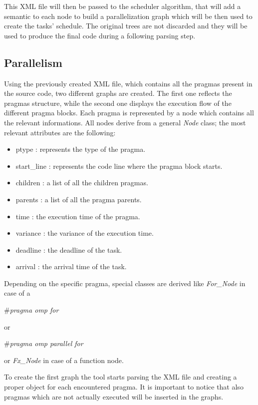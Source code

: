 \documentclass[a4paper,12pt,oneside]{book}
\begin{document}
This XML file will then be passed to the scheduler algorithm, that will add a semantic to each node to build a parallelization graph  which will be then used to create the tasks’ schedule. The original trees are not discarded and they will be used to produce the final code during a following parsing step.

\subsection{Parallelism}
\label{paralelism}

Using the previously created XML file, which contains all the pragmas present in the source code, two different graphs are created. The first one reflects the pragmas structure, while the second one displays the execution flow of the different pragma blocks. Each pragma is represented by a node which contains all the relevant informations. All nodes derive from a general \emph{Node} class; the most relevant attributes are the following:
\begin{itemize}
\item{ptype : represents the type of the pragma.}
\item{start\_line : represents the code line where the pragma block starts.}
\item{children : a list of all the children pragmas.}
\item{parents : a list of all the pragma parents.}
\item{time : the execution time of the pragma.}
\item{variance : the variance of the execution time.}
\item{deadline : the deadline of the task.}
\item{arrival : the arrival time of the task.}
\end{itemize}

Depending on the specific pragma, special classes are derived like \emph{For\_Node} in case of a \begin{bf}\emph{$\#$pragma omp for}\end{bf} or \begin{bf}\emph{$\#$pragma omp parallel for}\end{bf} or \emph{Fx\_Node} in case of a function node.

To create the first graph the tool starts parsing the XML file and creating a proper object for each encountered pragma. It is important to notice that also pragmas which are not actually executed will be inserted in the graphs. 
\end{document}
